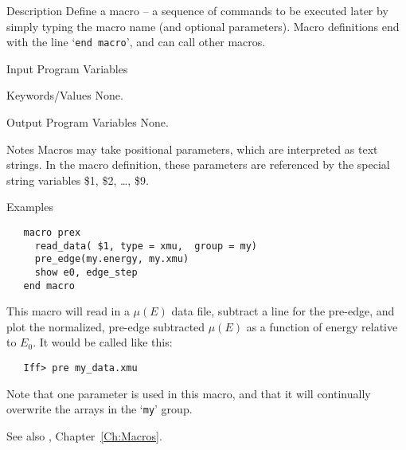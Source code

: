 \begin{IFFcom}
\item[Description] Define a macro -- a sequence of {\ifeffit} commands to
  be executed later by simply typing the macro name (and optional
  parameters).  Macro definitions end with the line `{\texttt{end macro}}',
  and can call other macros.
 
\item[Input Program Variables] 
\item[Keywords/Values] None.
\item[Output Program Variables] None.  
\item[Notes] Macros may take positional parameters, which are interpreted
  as text strings.  In the macro definition, these parameters are
  referenced by the special string variables \$1, \$2, \ldots, \$9.
\item[Examples] {\hspace{1.in} \vspace{-0.1truein} \relax }
\begin{verbatim} 
   macro prex 
     read_data( $1, type = xmu,  group = my)
     pre_edge(my.energy, my.xmu)
     show e0, edge_step
   end macro
\end{verbatim} \noindent %
  This macro will read in a $\mu(E)$ data file, subtract a line for the
  pre-edge, and plot the normalized, pre-edge subtracted $\mu(E)$ as a
  function of energy relative to $E_0$.   It would be called like this:
\begin{verbatim} 
   Iff> pre my_data.xmu
\end{verbatim} \noindent 
  Note that one parameter is used in this macro, and that it will
  continually overwrite the arrays in the `{\texttt{my}}' group.
\item[See also] {}, Chapter~{\ref{Ch:Macros}}. 
\end{IFFcom}



